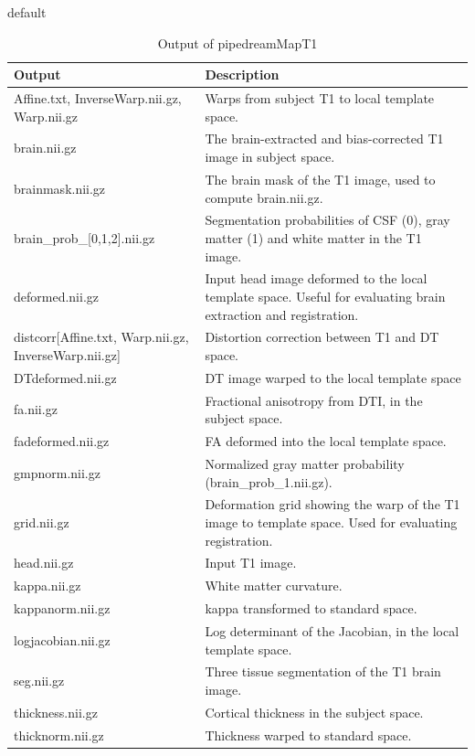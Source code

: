 \documentclass{InsightArticle}
\begin{document}
\begin{table}[htdp]
\caption{default}
\begin{center}
\begin{tabular}{| p{5cm} | p{10cm} |}
\hline
\textbf{Output} & \textbf{Description} \\ \hline
Affine.txt, InverseWarp.nii.gz, Warp.nii.gz & Warps from subject T1 to local template space. \\ \hline
brain.nii.gz & The brain-extracted and bias-corrected T1 image in subject space. \\ \hline
brainmask.nii.gz & The brain mask of the T1 image, used to compute brain.nii.gz. \\ \hline
brain\_prob\_[0,1,2].nii.gz & Segmentation probabilities of CSF (0), gray matter (1) and white matter in the T1 image. \\ \hline
deformed.nii.gz & Input head image deformed to the local template space. Useful for evaluating brain extraction and registration. \\ \hline
distcorr[Affine.txt, Warp.nii.gz, InverseWarp.nii.gz] & Distortion correction between T1 and DT space.\\ \hline
DTdeformed.nii.gz & DT image warped to the local template space \\ \hline
fa.nii.gz & Fractional anisotropy from DTI, in the subject space. \\ \hline
fadeformed.nii.gz & FA deformed into the local template space. \\ \hline
gmpnorm.nii.gz         & Normalized gray matter probability (brain\_prob\_1.nii.gz). \\ \hline
grid.nii.gz & Deformation grid showing the warp of the T1 image to template space. Used for evaluating registration. \\ \hline
head.nii.gz & Input T1 image. \\ \hline
kappa.nii.gz               & White matter curvature. \\ \hline
kappanorm.nii.gz   & kappa transformed to standard space. \\ \hline
logjacobian.nii.gz   & Log determinant of the Jacobian, in the local template space. \\ \hline
seg.nii.gz      & Three tissue segmentation of the T1 brain image.\\ \hline
thickness.nii.gz & Cortical thickness in the subject space. \\ \hline
thicknorm.nii.gz & Thickness warped to standard space. \\ \hline
\end{tabular}
\end{center}
\label{pipedreamMapT1out}
\caption{Output of pipedreamMapT1}
\end{table}%
\end{document}
